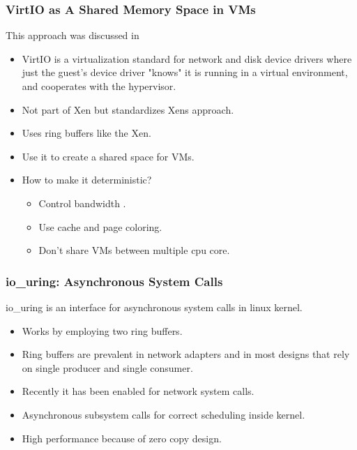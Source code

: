 \documentclass{beamer}
\begin{document}
\begin{frame}
    \frametitle{VirtIO as A Shared Memory Space in VMs}
    This approach was discussed in \cite{schwaricke2021real}
    \begin{itemize}
        \item VirtIO is a virtualization standard for network and disk device
            drivers where just the guest's device driver "knows" it is running
            in a virtual environment, and cooperates with the hypervisor.
        \item Not part of Xen but standardizes Xens approach.
        \item Uses ring buffers like the Xen.
        \item Use it to create a shared space for VMs.
        \item How to make it deterministic?
            \begin{itemize}
                \item Control bandwidth \cite{yun2013memguard}.
                \item Use cache and page coloring.
                \item Don't share VMs between multiple cpu core.
            \end{itemize}
    \end{itemize}
\end{frame}

\begin{frame}
    \frametitle{io\_uring: Asynchronous System Calls}
    io\_uring is an interface for asynchronous system calls in linux kernel. \\
    \begin{itemize}
        \item Works by employing two ring buffers.
        \item Ring buffers are prevalent in network adapters and in most
            designs that rely on single producer and single consumer.
        \item Recently it has been enabled for network system calls.
        \item Asynchronous subsystem calls for correct scheduling inside
            kernel.
        \item High performance because of zero copy design.
    \end{itemize}
\end{frame}
\end{document}
